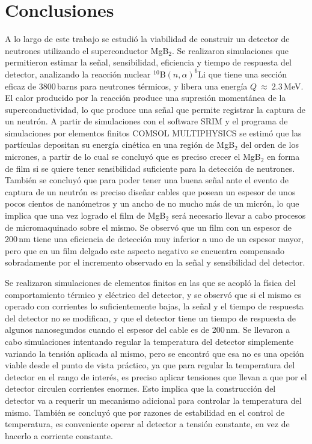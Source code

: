 \chapter{Conclusiones}\label{C:concl}
A lo largo de este trabajo se estudió la viabilidad de construir un detector de neutrones utilizando el superconductor MgB$_2$. Se realizaron simulaciones que permitieron estimar la señal, sensibilidad, eficiencia y tiempo de respuesta del detector, analizando la reacción nuclear $^{10}$B$(n,\alpha)^6$Li que tiene una sección eficaz de 3800\,barns para neutrones térmicos, y libera una energía $Q \ \approx \ 2.3$\,MeV. El calor producido por la reacción produce una supresión momentánea de la superconductividad, lo que produce una señal que permite registrar la captura de un neutrón. A partir de simulaciones con el software SRIM y el programa de simulaciones por elementos finitos COMSOL MULTIPHYSICS se estimó que las partículas depositan su energía cinética en una región de MgB$_2$ del orden de los micrones, a partir de lo cual se concluyó que es preciso crecer el MgB$_2$ en forma de film si se quiere tener sensibilidad suficiente para la detección de neutrones. También se concluyó que para poder tener una buena señal ante el evento de captura de un neutrón es preciso diseñar cables que posean un espesor de unos pocos cientos de nanómetros y un ancho de no mucho más de un micrón, lo que implica que una vez logrado el film de MgB$_2$ será necesario llevar a cabo procesos de micromaquinado sobre el mismo. Se observó que un film con un espesor de 200\,nm tiene una eficiencia de detección muy inferior a uno de un espesor mayor, pero que en un film delgado este aspecto negativo se encuentra compensado sobradamente por el incremento observado en la señal y sensibilidad del detector.

Se realizaron simulaciones de elementos finitos en las que se acopló la física del comportamiento térmico y eléctrico del detector, y se observó que si el mismo es operado con corrientes lo suficientemente bajas, la señal y el tiempo de respuesta del detector no se modifican, y que el detector tiene un tiempo de respuesta de algunos nanosegundos cuando el espesor del cable es de 200\,nm. Se llevaron a cabo simulaciones intentando regular la temperatura del detector simplemente variando la tensión aplicada al mismo, pero se encontró que esa no es una opción viable desde el punto de vista práctico, ya que para regular la temperatura del detector en el rango de interés, es preciso aplicar tensiones que llevan a que por el detector circulen corrientes enormes. Esto implica que la construcción del detector va a requerir un mecanismo adicional para controlar la temperatura del mismo. También se concluyó que por razones de estabilidad en el control de temperatura, es conveniente operar al detector a tensión constante, en vez de hacerlo a corriente constante.


